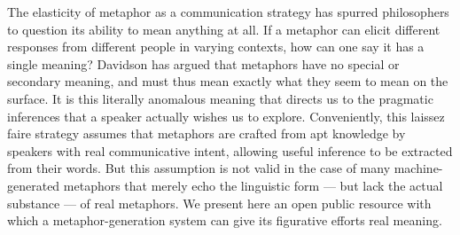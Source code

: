 The elasticity of metaphor as a communication strategy has spurred philosophers to question its ability to mean anything at all. If a metaphor can elicit different responses from different people in varying contexts, how can one say it has a single meaning? Davidson has argued that metaphors have no special or secondary meaning, and must thus mean exactly what they seem to mean on the surface. It is this literally anomalous meaning that directs us to the pragmatic inferences that a speaker actually wishes us to explore. Conveniently, this laissez faire strategy assumes that metaphors are crafted from apt knowledge by speakers with real communicative intent, allowing useful inference to be extracted from their words. But this assumption is not valid in the case of many machine-generated metaphors that merely echo the linguistic form --- but lack the actual substance --- of real metaphors. We present here an open public resource with which a metaphor-generation system can give its figurative efforts real meaning.
